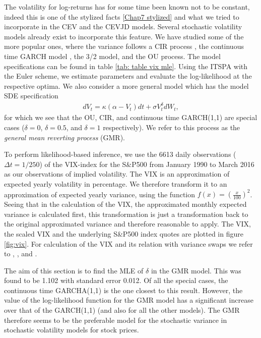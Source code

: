 		The volatility for log-returns has for some time been known not to be constant, indeed this is one of the stylized facts \ref{Chap7 stylized} and what we tried to incorporate in the CEV and the CEVJD models.
		Several stochastic volatility models already exist to incorporate this feature.
		We have studied some of the more popular ones, where the variance follows a CIR process \citep{heston1993closed}, the continuous time GARCH model \citep{brockwell2006continuous}, the 3/2 model, and the OU process.
		The model specifications can be found in table \ref{tab: table vix mle}.
		Using the ITSPA with the Euler scheme, we estimate parameters and evaluate the log-likelihood at the respective optima.
		We also consider a more general model which has the model SDE specification
		\begin{align}
		dV_t = \kappa(\alpha-V_t)dt + \sigma V_t^\delta dW_t,
		\end{align}
		for which we see that the OU, CIR, and continuous time GARCH(1,1) are special cases ($\delta=0$, $\delta=0.5$, and $\delta=1$ respectively).
		We refer to this process as the \textit{general mean reverting process} (GMR).
		
		To perform likelihood-based inference, we use the 6613 daily observations ($\Delta t=1/250$) of the  VIX-index for the S\&P500 from January 1990 to March 2016 as our observations of implied volatility.
		The VIX is an approximation of expected yearly volatility in percentage. %
		We therefore transform it to an approximation of expected yearly variance, using the function  $f(x)=\left(\frac{x}{100}\right)^2$.
		Seeing that in the calculation of the VIX, the approximated monthly expected variance is calculated first, this transformation is just a transformation back to the original approximated variance and therefore reasonable to apply.
		The VIX, the scaled VIX and the underlying S\&P500 index quotes are plotted in figure \ref{fig:vix}.
		For calculation of the VIX and its relation with variance swaps we refer to \cite{carr1998towards}, \cite{carr2005tale}, and \cite{exchange2009cboe}.%
		
		The aim of this section is to find the MLE of $\delta$ in the GMR model. This was found to be 1.102 with standard error 0.012.
		Of all the special cases, the continuous time GARCHA(1,1) is the one closest to this result.
		However, the value of the log-likelihood function for the GMR model has a significant increase over that of the GARCH(1,1) (and also for all the other models).
		The GMR therefore seems to be the preferable model for the stochastic variance in stochastic volatility models for stock prices.
		


